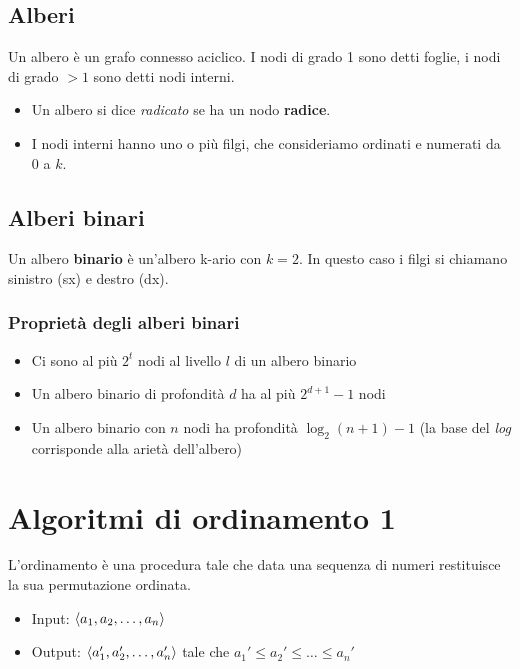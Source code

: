 \documentclass{article}
\begin{document}
\subsection{Alberi}
Un albero è un grafo connesso aciclico. I nodi di grado 1 sono detti foglie, i nodi di grado \(> 1\) sono detti nodi interni.
\begin{itemize}
  \item Un albero si dice \emph{radicato} se ha un nodo \textbf{radice}.
  \item I nodi interni hanno uno o più filgi, che consideriamo ordinati e numerati da \(0\) a \(k\).
\end{itemize}
\subsection*{Alberi binari}
Un albero \textbf{binario} è un'albero k-ario con \(k = 2\). In questo caso i filgi si chiamano sinistro (sx) e destro (dx).
\subsubsection*{Proprietà degli alberi binari}
\begin{itemize}
  \item Ci sono al più \(2^t\) nodi al livello \(l\) di un albero binario
  \item Un albero binario di profondità \(d\) ha al più \(2^{d+1}-1\) nodi
  \item Un albero binario con \(n\) nodi ha profondità \(\log_2(n+1)-1\) (la base del \emph{log} corrisponde alla arietà dell'albero)
\end{itemize}
\pagebreak

\section{Algoritmi di ordinamento 1}
L'ordinamento è una procedura tale che data una sequenza di numeri restituisce la sua permutazione ordinata.
\begin{itemize}
  \item Input: \(\langle a_1, a_2, \ldots, a_n \rangle\)
  \item Output: \(\langle a_1', a_2', \ldots, a_n' \rangle\) tale che \(a_1' \leq a_2' \leq \ldots \leq a_n'\)
\end{itemize}
\end{document}
